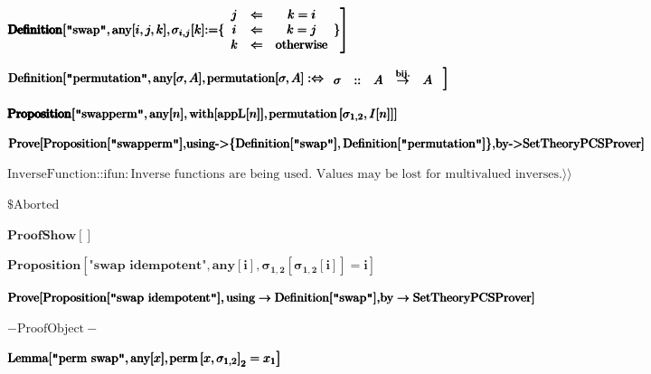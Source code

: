 \documentclass{article}
\begin{document}
\noindent\(\pmb{\pmb{\text{Definition}}[\text{$\texttt{"}$swap$\texttt{"}$},\text{any}[i,j,k],}\\
\pmb{\left.\sigma _{i,j}[k]\text{:=}\{
\begin{array}{ccc}
 j & \Leftarrow  & k=i \\
 i & \Leftarrow  & k=j \\
 k & \Leftarrow  & \text{otherwise}
\end{array}
\} \right]}\)

\noindent\(\pmb{\text{Definition}[\text{$\texttt{"}$permutation$\texttt{"}$},\text{any}[\sigma ,A],}\\
\pmb{\left.\text{permutation}[\sigma ,A]:\Leftrightarrow 
\begin{array}{ccccc}
 \sigma  & :: & A & \overset{\text{bij}.}{\rightarrow } & A\text{  }
\end{array}
\right]}\)

\noindent\(\pmb{\pmb{\text{Proposition}}[\text{$\texttt{"}$swapperm$\texttt{"}$},\text{any}[n],\text{with}[\text{appL}[n]],}\\
\pmb{\left.\text{permutation}\left[\sigma _{1,2},I[n]\right]\right]}\)

\noindent\(\pmb{\text{Prove}[\text{Proposition}[\text{$\texttt{"}$swapperm$\texttt{"}$}],}\\
\pmb{\text{using}\text{-$>$}\{\text{Definition}[\text{$\texttt{"}$swap$\texttt{"}$}],\text{Definition}[\text{$\texttt{"}$permutation$\texttt{"}$}]\},}\\
\pmb{\text{by}\text{-$>$}\text{SetTheoryPCSProver}]}\)

\noindent\(\text{InverseFunction}\text{::}\text{ifun}: \text{Inverse functions are being used. Values may be lost for multivalued inverses.} \rangle\rangle
\)

\noindent\(\text{$\$$Aborted}\)

\noindent\(\pmb{\text{ProofShow}[]}\)

\noindent\(\pmb{\text{Proposition}\left[\text{$\texttt{"}$swap idempotent$\texttt{"}$},\text{any}[i],\sigma _{1,2}\left[\sigma _{1,2}[i]\right]=i\right]}\)

\noindent\(\pmb{\text{Prove}[\text{Proposition}[\text{$\texttt{"}$swap idempotent$\texttt{"}$}],\text{using}\to \text{Definition}[\text{$\texttt{"}$swap$\texttt{"}$}],}\\
\pmb{\text{by}\to \text{SetTheoryPCSProver}]}\)

\noindent\(- \text{ProofObject} -\)

\noindent\(\pmb{\text{Lemma}[\text{$\texttt{"}$perm swap$\texttt{"}$},\text{any}[x],}\\
\pmb{\left.\text{perm}\left[x,\sigma _{1,2}\right]_2=x_1\right]}\)
\end{document}
